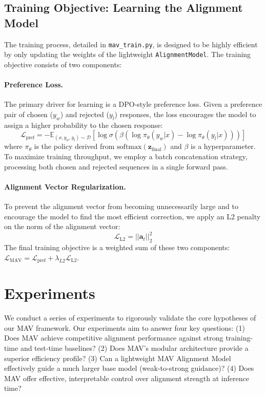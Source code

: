 \documentclass{article} %
\begin{document}
\subsection{Training Objective: Learning the Alignment Model}

The training process, detailed in \texttt{mav\_train.py}, is designed to be highly efficient by only updating the weights of the lightweight \texttt{AlignmentModel}. The training objective consists of two components:

\paragraph{Preference Loss.} The primary driver for learning is a DPO-style preference loss. Given a preference pair of chosen ($y_w$) and rejected ($y_l$) responses, the loss encourages the model to assign a higher probability to the chosen response:
\begin{equation}
    \mathcal{L}_{\text{pref}} = -\mathbb{E}_{ (x, y_w, y_l) \sim \mathcal{D} } \left[ \log \sigma \left( \beta \left( \log \pi_{\theta}(y_w|x) - \log \pi_{\theta}(y_l|x) \right) \right) \right]
\end{equation}
where $\pi_{\theta}$ is the policy derived from $\text{softmax}(\mathbf{z}_{\text{final}})$ and $\beta$ is a hyperparameter. To maximize training throughput, we employ a batch concatenation strategy, processing both chosen and rejected sequences in a single forward pass.

\paragraph{Alignment Vector Regularization.} To prevent the alignment vector from becoming unnecessarily large and to encourage the model to find the most efficient correction, we apply an L2 penalty on the norm of the alignment vector:
\begin{equation}
    \mathcal{L}_{\text{L2}} = ||\mathbf{a}_t||_2^2
\end{equation}
The final training objective is a weighted sum of these two components: $\mathcal{L}_{\text{MAV}} = \mathcal{L}_{\text{pref}} + \lambda_{L2} \mathcal{L}_{\text{L2}}$.
\section{Experiments}
We conduct a series of experiments to rigorously validate the core hypotheses of our MAV framework. Our experiments aim to answer four key questions: (1) Does MAV achieve competitive alignment performance against strong training-time and test-time baselines? (2) Does MAV's modular architecture provide a superior efficiency profile? (3) Can a lightweight MAV Alignment Model effectively guide a much larger base model (weak-to-strong guidance)? (4) Does MAV offer effective, interpretable control over alignment strength at inference time?
\end{document}
